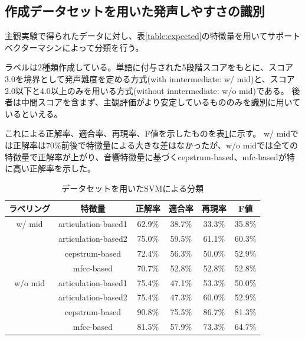 \documentclass[10.5ptj,a4j,dvipdfmx,uplatex, oneside, openany, report]{jsbook}%
\begin{document}
\subsection{作成データセットを用いた発声しやすさの識別}
主観実験で得られたデータに対し、表\ref{table:expected}の特徴量を用いてサポートベクターマシンによって分類を行う。

ラベルは2種類作成している。単語に付与された5段階スコアをもとに、スコア3.0を境界として発声難度を定める方式(with inntermediate: w/ mid)と、スコア2.0以下と4.0以上のみを用いる方式(without inntermediate: w/o mid)である。
後者は中間スコアを含まず、主観評価がより安定しているもののみを識別に用いているといえる。

これによる正解率、適合率、再現率、F値を示したものを表\ref{table:SVM}に示す。
w/ midでは正解率は70\%前後で特徴量による大きな差はなかったが、w/o midでは全ての特徴量で正解率が上がり、音響特徴量に基づくcepstrum-based、mfc-basedが特に高い正解率を示した。

\begin{table}[h]
    \small
    \caption{データセットを用いたSVMによる分類}
    \label{table:SVM}
    \centering
\begin{tabular}{cccccc}
    \hline
    ラベリング & 特徴量 & 正解率 & 適合率 & 再現率 & F値\\
    \hline \hline
    w/ mid & articulation-based1 & 62.9\% & 38.7\% & 33.3\% & 35.8\%\\
    & articulation-based2 & 75.0\% & 59.5\% & 61.1\% & 60.3\%\\
    & cepstrum-based & 72.4\% & 56.3\% & 50.0\% & 52.9\%\\
    & mfcc-based & 70.7\% & 52.8\% & 52.8\% & 52.8\%\\
    \hline
    w/o mid & articulation-based1 & 75.4\% & 47.1\% & 53.3\% & 50.0\%\\
    & articulation-based2 & 75.4\% & 47.3\% & 60.0\% & 52.9\%\\
    & cepstrum-based & 90.8\% & 75.5\% & 86.7\% & 81.3\%\\
    & mfcc-based & 81.5\% & 57.9\% & 73.3\% & 64.7\%\\
    \hline

\end{tabular}
\end{table}
\end{document}
